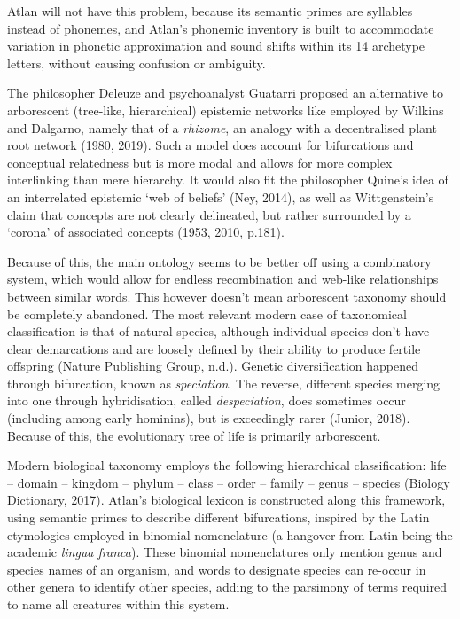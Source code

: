 Atlan will not have this problem, because its semantic primes are syllables instead of phonemes, and Atlan’s phonemic inventory is built to accommodate variation in phonetic approximation and sound shifts within its 14 archetype letters, without causing confusion or ambiguity. 

The philosopher Deleuze and psychoanalyst Guatarri proposed an alternative to arborescent (tree-like, hierarchical) epistemic networks like employed by Wilkins and Dalgarno, namely that of a {\it rhizome}, an analogy with a decentralised plant root network (1980, 2019). Such a model does account for bifurcations and conceptual relatedness but is more modal and allows for more complex interlinking than mere hierarchy. It would also fit the philosopher Quine’s idea of an interrelated epistemic ‘web of beliefs’ (Ney, 2014), as well as Wittgenstein’s claim that concepts are not clearly delineated, but rather surrounded by a ‘corona’ of associated concepts (1953, 2010, p.181). 

Because of this, the main ontology seems to be better off using a combinatory system, which would allow for endless recombination and web-like relationships between similar words. This however doesn’t mean arborescent taxonomy should be completely abandoned. The most relevant modern case of taxonomical classification is that of natural species, although individual species don’t have clear demarcations and are loosely defined by their ability to produce fertile offspring (Nature Publishing Group, n.d.). Genetic diversification happened through bifurcation, known as {\it speciation}. The reverse, different species merging into one through hybridisation, called {\it despeciation}, does sometimes occur (including among early hominins), but is exceedingly rarer (Junior, 2018). Because of this, the evolutionary tree of life is primarily arborescent. 

Modern biological taxonomy employs the following hierarchical classification: life – domain – kingdom – phylum – class – order – family – genus – species (Biology Dictionary, 2017). Atlan’s biological lexicon is constructed along this framework, using semantic primes to describe different bifurcations, inspired by the Latin etymologies employed in binomial nomenclature (a hangover from Latin being the academic {\it lingua franca}). These binomial nomenclatures only mention genus and species names of an organism, and words to designate species can re-occur in other genera to identify other species, adding to the parsimony of terms required to name all creatures within this system. 

